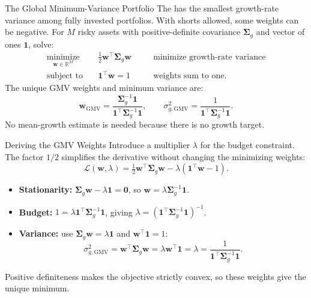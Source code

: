 \documentclass[aspectratio=169,11pt]{beamer}
\newcommand{\bw}{\mathbf{w}}
\newcommand{\bone}{\mathbf{1}}
\newcommand{\Sig}{\boldsymbol{\Sigma}_{g}}
\begin{document}
\begin{frame}{The Global Minimum-Variance Portfolio}
  The  has the smallest
  growth-rate variance among fully invested portfolios. With shorts allowed,
  some weights can be negative. For $M$ risky assets with positive-definite
  covariance $\Sig$ and vector of ones $\bone$, solve:
  \[
    \boxed{
    \begin{aligned}
      \underset{\bw\in\mathbb R^M}{\text{minimize}}\quad
        &\tfrac12\bw^{\top}\Sig\bw
        &&\quad\text{minimize growth-rate variance}\\
      \text{subject to}\quad &\bone^{\top}\bw=1
        &&\quad\text{weights sum to one}.
    \end{aligned}}
  \]
  The unique GMV weights and minimum variance are:
  \[
    \boxed{\bw_{\mathrm{GMV}}
      =\frac{\Sig^{-1}\bone}{\bone^{\top}\Sig^{-1}\bone},
      \qquad \sigma^2_{g,\mathrm{GMV}}
      =\frac{1}{\bone^{\top}\Sig^{-1}\bone}.}
  \]
  No mean-growth estimate is needed because there is no growth target.
\end{frame}

\begin{frame}{Deriving the GMV Weights}
  Introduce a multiplier $\lambda$ for the budget constraint. The factor
  $1/2$ simplifies the derivative without changing the minimizing weights:
  \[
    \mathcal L(\bw,\lambda)=\tfrac12\bw^{\top}\Sig\bw
      -\lambda(\bone^{\top}\bw-1).
  \]

  \begin{itemize}\setlength{\itemsep}{0.3em}
    \item \textbf{Stationarity:}
      $\Sig\bw-\lambda\bone=\mathbf0$, so
      $\bw=\lambda\Sig^{-1}\bone$.
    \item \textbf{Budget:}
      $1=\lambda\bone^{\top}\Sig^{-1}\bone$, giving
      $\lambda=(\bone^{\top}\Sig^{-1}\bone)^{-1}$.
    \item \textbf{Variance:} use $\Sig\bw=\lambda\bone$ and
      $\bw^{\top}\bone=1$:
      \[
        \sigma^2_{g,\mathrm{GMV}}
          =\bw^{\top}\Sig\bw
          =\lambda\bw^{\top}\bone
          =\lambda
          =\frac{1}{\bone^{\top}\Sig^{-1}\bone}.
      \]
  \end{itemize}

  Positive definiteness makes the objective strictly convex, so these
  weights give the unique minimum.
\end{frame}
\end{document}
